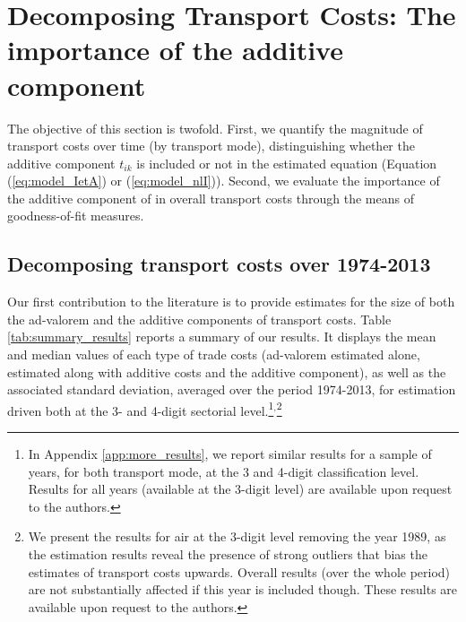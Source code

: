 \documentclass[a4paper,11pt]{article}
\begin{document}


\section{Decomposing Transport Costs: The importance of the additive component \label{sec:results_decomposition}}

The objective of this section is twofold. First, we quantify the magnitude of transport costs over time (by transport mode), distinguishing whether the additive component $t_{ik}$ is included or not in the estimated equation (Equation (\ref{eq:model_IetA}) or (\ref{eq:model_nlI})). Second, we evaluate the importance of the additive component of in overall transport costs through the means of goodness-of-fit measures.


\subsection{Decomposing transport costs over 1974-2013}

Our first contribution to the literature is to provide estimates for the size of both the ad-valorem and the additive components of transport costs. Table \ref{tab:summary_results} reports a summary of our results. It displays the mean and median values of each type of trade costs (ad-valorem estimated alone, estimated along with additive costs and the additive component), as well as the associated standard deviation, averaged over the period 1974-2013, for estimation driven both at the 3- and 4-digit sectorial level.\footnote{In Appendix \ref{app:more_results}, we report similar results for a sample of years, for both transport mode, at the 3 and 4-digit classification level. Results for all years (available at the 3-digit level) are available upon request to the authors.}$^{,}$\footnote{We present the results for air at the 3-digit level removing the year 1989, as the estimation results reveal the presence of strong outliers that bias the estimates of transport costs upwards. Overall results (over the whole period) are not substantially affected if this year is included though. These results are available upon request to the authors.}
\end{document}
